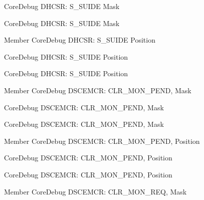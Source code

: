 \begin{DoxyRefList}
\label{deprecated__deprecated000016}%
%
Core\+Debug DHCSR\+: S\+\_\+\+SUIDE Mask 

\label{deprecated__deprecated000467}%
%
Core\+Debug DHCSR\+: S\+\_\+\+SUIDE Mask  
\item[Member \doxylink{group__CMSIS__SCB_gacff001d7e8c9665a1dc91018f2505d3d}{Core\+Debug\+\_\+\+DHCSR\+\_\+\+S\+\_\+\+SUIDE\+\_\+\+Pos} ]\label{deprecated__deprecated000015}%
%
Core\+Debug DHCSR\+: S\+\_\+\+SUIDE Position 

\label{deprecated__deprecated000466}%
%
Core\+Debug DHCSR\+: S\+\_\+\+SUIDE Position 

\label{deprecated__deprecated000568}%
%
Core\+Debug DHCSR\+: S\+\_\+\+SUIDE Position  
\item[Member \doxylink{group__CMSIS__SCB_gacfb17801664286ab627a094d5fb3da20}{Core\+Debug\+\_\+\+DSCEMCR\+\_\+\+CLR\+\_\+\+MON\+\_\+\+PEND\+\_\+\+Msk} ]\label{deprecated__deprecated000525}%
%
Core\+Debug DSCEMCR\+: CLR\+\_\+\+MON\+\_\+\+PEND, Mask 

\label{deprecated__deprecated000627}%
%
Core\+Debug DSCEMCR\+: CLR\+\_\+\+MON\+\_\+\+PEND, Mask 

\label{deprecated__deprecated000074}%
%
Core\+Debug DSCEMCR\+: CLR\+\_\+\+MON\+\_\+\+PEND, Mask  
\item[Member \doxylink{group__CMSIS__SCB_ga2295235d9c595bd6f287728f4c395bbf}{Core\+Debug\+\_\+\+DSCEMCR\+\_\+\+CLR\+\_\+\+MON\+\_\+\+PEND\+\_\+\+Pos} ]\label{deprecated__deprecated000626}%
%
Core\+Debug DSCEMCR\+: CLR\+\_\+\+MON\+\_\+\+PEND, Position 

\label{deprecated__deprecated000073}%
%
Core\+Debug DSCEMCR\+: CLR\+\_\+\+MON\+\_\+\+PEND, Position 

\label{deprecated__deprecated000524}%
%
Core\+Debug DSCEMCR\+: CLR\+\_\+\+MON\+\_\+\+PEND, Position  
\item[Member \doxylink{group__CMSIS__SCB_gaea36b8cede2cc1184176eb20b7bd0f8d}{Core\+Debug\+\_\+\+DSCEMCR\+\_\+\+CLR\+\_\+\+MON\+\_\+\+REQ\+\_\+\+Msk} ]\label{deprecated__deprecated000523}%
%
Core\+Debug DSCEMCR\+: CLR\+\_\+\+MON\+\_\+\+REQ, Mask 


\end{DoxyRefList}
